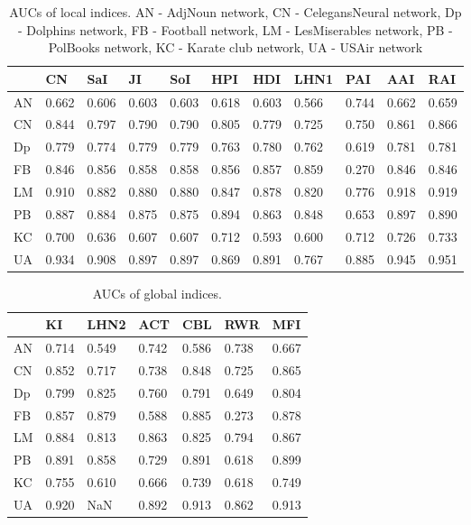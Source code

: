 \documentclass{llncs}
\begin{document}
\setlength{\tabcolsep}{5pt}
\renewcommand{\arraystretch}{1.5}
\begin{table}
\begin{center}
\caption{AUCs of local indices. AN - AdjNoun network, CN - CelegansNeural network, Dp - Dolphins network, FB - Football network, LM - LesMiserables network, PB - PolBooks network, KC - Karate club network, UA - USAir network}
\begin{tabular}{| l | l | l | l | l | l | l | l | l | l | l |}
\hline
& CN & SaI & JI & SoI & HPI & HDI & LHN1 & PAI & AAI & RAI \\ \hline
AN & 0.662 & 0.606 & 0.603 & 0.603 & 0.618 & 0.603 & 0.566 & 0.744 & 0.662 & 0.659 \\ \hline
CN & 0.844 & 0.797 & 0.790 & 0.790 & 0.805 & 0.779 & 0.725 & 0.750 & 0.861 & 0.866 \\ \hline
Dp & 0.779 & 0.774 & 0.779 & 0.779 & 0.763 & 0.780 & 0.762 & 0.619 & 0.781 & 0.781 \\ \hline
FB & 0.846 & 0.856 & 0.858 & 0.858 & 0.856 & 0.857 & 0.859 & 0.270 & 0.846 & 0.846 \\ \hline
LM & 0.910 & 0.882 & 0.880 & 0.880 & 0.847 & 0.878 & 0.820 & 0.776 & 0.918 & 0.919 \\ \hline
PB & 0.887 & 0.884 & 0.875 & 0.875 & 0.894 & 0.863 & 0.848 & 0.653 & 0.897 & 0.890 \\ \hline
KC & 0.700 & 0.636 & 0.607 & 0.607 & 0.712 & 0.593 & 0.600 & 0.712 & 0.726 & 0.733 \\ \hline
UA & 0.934 & 0.908 & 0.897 & 0.897 & 0.869 & 0.891 & 0.767 & 0.885 & 0.945 & 0.951 \\ 
\hline
\end{tabular}
\end{center}
\end{table}

\setlength{\tabcolsep}{5pt}
\renewcommand{\arraystretch}{1.5}
\begin{table}
\begin{center}
\caption{AUCs of global indices.}
\begin{tabular}{| l | l | l | l | l | l | l |}
\hline
& KI & LHN2 & ACT & CBL & RWR & MFI \\ \hline
AN & 0.714 & 0.549 & 0.742 & 0.586 & 0.738 & 0.667 \\ \hline
CN & 0.852 & 0.717 & 0.738 & 0.848 & 0.725 & 0.865 \\ \hline
Dp & 0.799 & 0.825 & 0.760 & 0.791 & 0.649 & 0.804 \\ \hline
FB & 0.857 & 0.879 & 0.588 & 0.885 & 0.273 & 0.878 \\ \hline
LM & 0.884 & 0.813 & 0.863 & 0.825 & 0.794 & 0.867 \\ \hline
PB & 0.891 & 0.858 & 0.729 & 0.891 & 0.618 & 0.899 \\ \hline
KC & 0.755 & 0.610 & 0.666 & 0.739 & 0.618 & 0.749 \\ \hline
UA & 0.920 & NaN & 0.892 & 0.913 & 0.862 & 0.913 \\ 
\hline
\end{tabular}
\end{center}
\end{table}
%
\end{document}
